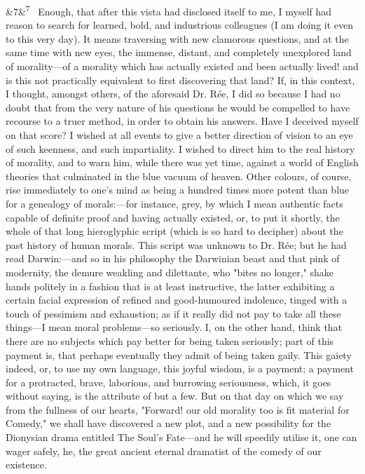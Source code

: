 \documentclass[12pt]{article}
\newcommand{\para}[1][]{\par\noindent\ifx&#1&\else\textsuperscript{\footnotesize #1}~\fi}
\begin{document}
\para[7] Enough, that after this vista had disclosed itself to me, I myself had reason to search for learned, bold, and industrious colleagues (I am doing it even to this very day). It means traversing with new clamorous questions, and at the same time with new eyes, the immense, distant, and completely unexplored land of morality---of a morality which has actually existed and been actually lived! and is this not practically equivalent to first discovering that land? If, in this context, I thought, amongst others, of the aforesaid Dr. Rée, I did so because I had no doubt that from the very nature of his questions he would be compelled to have recourse to a truer method, in order to obtain his answers. Have I deceived myself on that score? I wished at all events to give a better direction of vision to an eye of such keenness, and such impartiality. I wished to direct him to the real history of morality, and to warn him, while there was yet time, against a world of English theories that culminated in the blue vacuum of heaven. Other colours, of course, rise immediately to one's mind as being a hundred times more potent than blue for a genealogy of morals:---for instance, grey, by which I mean authentic facts capable of definite proof and having actually existed, or, to put it shortly, the whole of that long hieroglyphic script (which is so hard to decipher) about the past history of human morals. This script was unknown to Dr. Rée; but he had read Darwin:---and so in his philosophy the Darwinian beast and that pink of modernity, the demure weakling and dilettante, who "bites no longer," shake hands politely in a fashion that is at least instructive, the latter exhibiting a certain facial expression of refined and good-humoured indolence, tinged with a touch of pessimism and exhaustion; as if it really did not pay to take all these things---I mean moral problems---so seriously. I, on the other hand, think that there are no subjects which pay better for being taken seriously; part of this payment is, that perhaps eventually they admit of being taken gaily. This gaiety indeed, or, to use my own language, this joyful wisdom, is a payment; a payment for a protracted, brave, laborious, and burrowing seriousness, which, it goes without saying, is the attribute of but a few. But on that day on which we say from the fullness of our hearts, "Forward! our old morality too is fit material for Comedy," we shall have discovered a new plot, and a new possibility for the Dionysian drama entitled The Soul's Fate---and he will speedily utilise it, one can wager safely, he, the great ancient eternal dramatist of the comedy of our existence.
\end{document}
